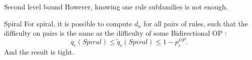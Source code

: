 \documentclass{beamer}
\begin{document}
\begin{frame}{Second level bound}
	However, knowing one rule subfamilies is not enough.
	\begin{block}{Spiral}
		For spiral, it is possible to compute $d_u$ for all pairs of rules, such that the difficulty on pairs is the same as the difficulty of some Bidirectional OP :
		\begin{equation*}
			q_c(Spiral) \leq \tilde q_c(Spiral) \leq 1 - p_c^{OP}.
		\end{equation*}
		And the result is tight.
	\end{block}

\end{frame}
\end{document}
